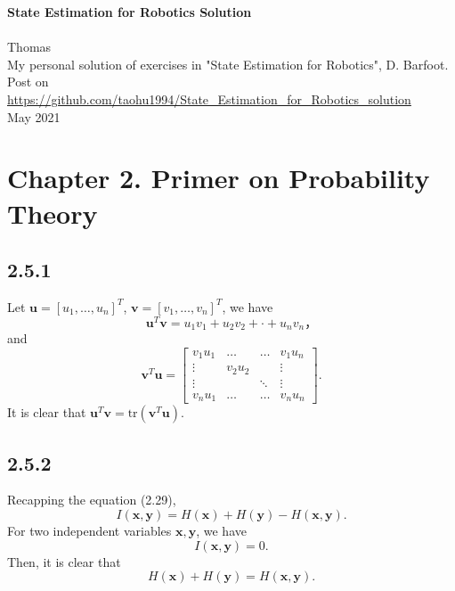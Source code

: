 \documentclass[a4paper, 11pt]{article}
\begin{document}
\noindent
\large
\textbf{State Estimation for Robotics Solution} \hfill  \\
\large
\\
\normalsize 
Thomas\hfill \\
  My personal solution of exercises in "State Estimation for Robotics", D. Barfoot. \hfill  \\
Post on \url{ https://github.com/taohu1994/State_Estimation_for_Robotics_solution}
\\
May 2021


\section{Chapter 2. Primer on Probability Theory}
\subsection{2.5.1}
Let $\mathbf{u}= [u_1,\dots,u_n]^T$, $\mathbf{v}= [v_1,\dots,v_n]^T$, we have
\begin{equation*}
    \mathbf{u}^T\mathbf{v} = u_1v_1+u_2v_2+\cdot+u_nv_n，
\end{equation*}
and
\begin{equation*}
     \mathbf{v}^T\mathbf{u} =\begin{bmatrix}
     v_1u_1 & \dots & \dots & v_1u_n  \\
     \vdots & v_2u_2 &  &  \vdots\\
    \vdots   &   & \ddots  & \vdots \\
     v_nu_1   & \dots & \dots   & v_nu_n
     \end{bmatrix}.
\end{equation*}
It is clear that $  \mathbf{u}^T\mathbf{v} = \text{tr}( \mathbf{v}^T\mathbf{u})$.
\subsection{2.5.2}
Recapping the equation (2.29),
\begin{equation*}
    I(\mathbf{x},\mathbf{y}) = H(\mathbf{x})+H(\mathbf{y})-H(\mathbf{x},\mathbf{y}).
\end{equation*}
For two independent variables $\mathbf{x},\mathbf{y}$, we have 
\begin{equation*}
    I(\mathbf{x},\mathbf{y}) = 0.
\end{equation*}
Then, it is clear that
\begin{equation*}
      H(\mathbf{x})+H(\mathbf{y})=H(\mathbf{x},\mathbf{y}).
\end{equation*}
\end{document}
